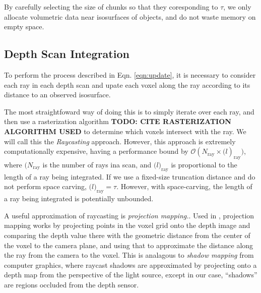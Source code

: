 \documentclass[conference,10pt]{IEEEtran}
\begin{document}
By carefully selecting the size of chunks so that they coresponding to $\tau$,
we only allocate volumetric data near isosurfaces of objects, and do not waste
memory on empty space.

\subsection{Depth Scan Integration}
\label{section:scan_integration}
To perform the process described in Eqn. \ref{eqn:update}, it is necessary
to consider each ray in each depth scan and upate each voxel
along the ray according to its distance to an observed isosurface.

The most straightfoward way of doing this is to simply iterate over each ray,
and then use a rasterization algorithm \textbf{TODO: CITE RASTERIZATION
ALGORITHM USED} to determine which voxels intersect with the ray. We will call
this the \textit{Raycasting} approach. However, this approach is extremely
computationally expensive, having a performance bound by 
$\mathcal{O}(N_{\text{ray}} \times \mathcal(l)_{\text{ray}})$, where 
$(N_{\text{ray}}$ is the number of rays ina  scan, and
$\mathcal(l)_{\text{ray}}$  is  proportional to the length of a ray being
integrated. If we use a fixed-size truncation distance and do not perform  space
carving, $\mathcal(l)_{\text{ray}} = \tau$. However, with space-carving, the
length of a ray being integrated is potentially unbounded.

A useful approximation of raycasting is \textit{projection mapping.}. Used in
\cite{Bylow2013, Klingensmith2014}, projection mapping works by projecting
points in the voxel grid onto the depth image and comparing the depth value
there with the geometric distance from the center of the voxel to the camera
plane, and using that to approximate the distance along the ray from the camera
to the voxel. This is analagous to \textit{shadow mapping} \cite{Shadowmapping}
from computer graphics, where raycast shadows are approximated by projecting
onto a depth map from the perspective of the light source, except in our case, 
``shadows'' are regions occluded from the depth sensor.  
\end{document}
